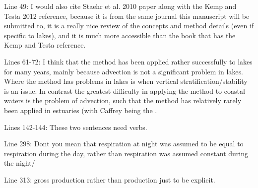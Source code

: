 \documentclass[letterpaper,12pt]{article}\usepackage[]{graphicx}\usepackage[]{color}
\begin{document}
Line 49: I would also cite Staehr et al. 2010 paper along with the Kemp and Testa 2012 reference, because it is from the same journal this manuscript will be submitted to, it is a really nice review of the concepts and method details (even if specific to lakes), and it is much more accessible than the book that has the Kemp and Testa reference.

Lines 61-72: I think that the method has been applied rather successfully to lakes for many years, mainly because advection is not a significant problem in lakes. Where the method has problems in lakes is when vertical stratification/stability is an issue. In contrast the greatest difficulty in applying the method to coastal waters is the problem of advection, such that the method has relatively rarely been applied in estuaries (with Caffrey being the .

Lines 142-144: These two sentences need verbs.

Line 298: Dont you mean that respiration at night was assumed to be equal to respiration during the day, rather than respiration was assumed constant during the night/

Line 313: gross production rather than production just to be explicit.
\end{document}
